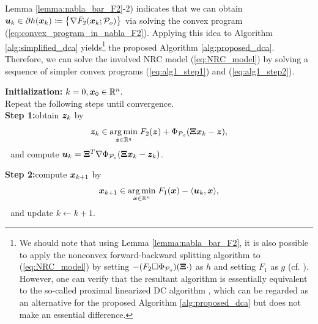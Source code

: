\documentclass[lettersize,journal]{IEEEtran}
\theoremstyle{plain}%
\theoremstyle{definition}
\theoremstyle{remark}
\begin{document}
Lemma \ref{lemma:nabla_bar_F2}-2) indicates that we can obtain $\bm{u}_k\in\partial h(\bm{x}_k)\coloneqq \left\{ \nabla \bar{F}_2(\bm{x}_k;\mathcal{P}_o) \right\}$ via solving the convex program (\ref{eq:convex_program_in_nabla_F2}). Applying this idea to Algorithm \ref{alg:simplified_dca} yields\footnote{We should note that using Lemma \ref{lemma:nabla_bar_F2}, it is also possible to apply the nonconvex forward-backward splitting algorithm to (\ref{eq:NRC_model}) by setting $-(F_2\Box\Phi_{\mathcal{P}_o})(\bm{\Xi}\cdot)$ as $h$ and setting $F_1$ as $g$ (cf. \cite[Eq. (50)]{attouch2013}). However, one can verify that the resultant algorithm is essentially equivalent to the so-called proximal linearized DC algorithm \cite{souza2016}, which can be regarded as an alternative for the proposed Algorithm \ref{alg:proposed_dca} but does not make an essential difference.} the proposed Algorithm \ref{alg:proposed_dca}. Therefore, we can solve the involved NRC model (\ref{eq:NRC_model}) by solving a sequence of simpler convex programs (\ref{eq:alg1_step1}) and (\ref{eq:alg1_step2}).

\begin{algorithm}
\textbf{Initialization:} $k=0, \bm{x}_0\in\mathbb{R}^n.$\\
Repeat the following steps until convergence.\\
\textbf{Step 1:}\quad obtain $\bm{z}_k$ by
\begin{equation}\label{eq:alg1_step1}
\bm{z}_k\in\underset{\bm{z}\in\mathbb{R}^q}{\mathrm{arg\,min}}\; F_2(\bm{z})+\Phi_{\mathcal{P}_o}(\bm{\Xi} \bm{x}_k-\bm{z}),
\end{equation}
\quad\quad\quad$\,\,$ and compute $\bm{u}_k=\bm{\Xi}^T\nabla \Phi_{\mathcal{P}_o}(\bm{\Xi} \bm{x}_k-\bm{z}_k)$.

\textbf{Step 2:}\quad compute $\bm{x}_{k+1}$ by
\begin{equation}\label{eq:alg1_step2}
\bm{x}_{k+1}\in\underset{\bm{x}\in\mathbb{R}^n}{\mathrm{arg\,min}}\; F_1(\bm{x})-\langle \bm{u}_k, \bm{x} \rangle,
\end{equation}
\quad\quad\quad$\,\,$ and update $k\leftarrow k+1$.

\caption{Proposed DC algorithm for solving (\ref{eq:NRC_model})}\label{alg:proposed_dca}
\end{algorithm}
\end{document}
